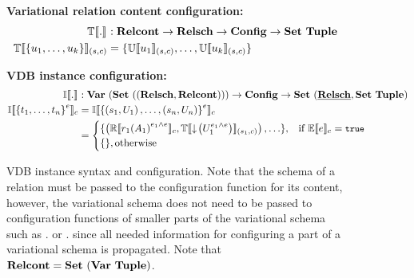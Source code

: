 \begin{figure}
\textbf{Variational relation content configuration:}
%
\begin{alignat*}{1}%
\otSemType [] . &: \vRelContSet \to \vRelSchSet \to \confSet \to \pRelContSet\\
%
\otSem {\vRelSch} {\setDef {\vi \tuple \numTuples}} &= \setDef {\ouSem {\vRelSch}{\tuple_1}, \hdots, \ouSem{\vRelSch} {\tuple_\numTuples}}
\end{alignat*}

\textbf{VDB instance configuration:}
%
\begin{alignat*}{1}%
\odbSem [] . &: \vdbInstSet \to \confSet \to \pInstSet\\
%
\odbSem { \annot  {\setDef {\vi \vTab \numRels}}} 
&=\odbSem { \annot  { \setDef {\left( \vRelSch_1, \vRelCont_1\right), \ldots, 
\left( \vRelSch_\numRels, \vRelCont_\numRels\right)}}}\\
& = \begin{cases}
\setDef{\left( \orSem {\vRel_1 \annot [\dimMeta_1 {\wedge \dimMeta}] {\left( \vAttList_1 \right)} }, 
\otSem {\vRelSch_1} {\pushIn {\annot [\dimMeta_1 {\wedge \dimMeta}] \vRelCont_1}} \right), \ldots}, &\If \fSem \dimMeta = \t \\
\setDef {}, \Otherwise
\end{cases}
\end{alignat*}

\caption{VDB instance syntax and configuration.
Note that the schema of a relation must be passed to the configuration function
for its content,
however, the variational schema does not need to be passed to configuration 
functions of smaller parts of the variational schema such as \orSem .  or \olSem .
since all needed information for configuring a part of a variational schema
is propagated. 
Note that $\vRelContSet = \settype {(\vartype \tupletype)}$.
}
\label{fig:vdb-conf}
\end{figure} 
